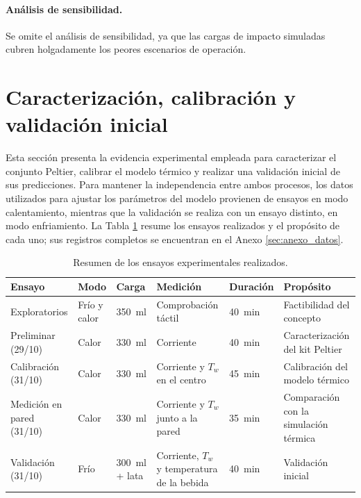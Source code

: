\documentclass[12pt, a4paper]{article}
\begin{document}
\paragraph{Análisis de sensibilidad.} Se omite el análisis de sensibilidad, ya que las cargas de impacto simuladas cubren holgadamente los peores escenarios de operación.

\section{Caracterización, calibración y validación inicial}
\label{sec:calibracion}

Esta sección presenta la evidencia experimental empleada para caracterizar el conjunto Peltier, calibrar el modelo térmico y realizar una validación inicial de sus predicciones. Para mantener la independencia entre ambos procesos, los datos utilizados para ajustar los parámetros del modelo provienen de ensayos en modo calentamiento, mientras que la validación se realiza con un ensayo distinto, en modo enfriamiento. La Tabla \ref{tab:resumen_ensayos} resume los ensayos realizados y el propósito de cada uno; sus registros completos se encuentran en el Anexo \ref{sec:anexo_datos}.

\begin{table}[H]
\centering
\small
\begin{tabularx}{\textwidth}{@{}>{\RaggedRight\arraybackslash}p{2.6cm} >{\Centering\arraybackslash}p{1.6cm} >{\Centering\arraybackslash}p{1.7cm} >{\RaggedRight\arraybackslash}X >{\Centering\arraybackslash}p{1.3cm} >{\RaggedRight\arraybackslash}p{2.6cm}@{}}
\toprule
\textbf{Ensayo} & \textbf{Modo} & \textbf{Carga} & \textbf{Medición} & \textbf{Duración} & \textbf{Propósito} \\
\midrule
Exploratorios & Frío y calor & \SI{350}{\ml} & Comprobación táctil & \SI{40}{\minute} & Factibilidad del concepto \\
Preliminar (29/10) & Calor & \SI{330}{\ml} & Corriente & \SI{40}{\minute} & Caracterización del kit Peltier \\
Calibración (31/10) & Calor & \SI{330}{\ml} & Corriente y $T_w$ en el centro & \SI{45}{\minute} & Calibración del modelo térmico \\
Medición en pared (31/10) & Calor & \SI{330}{\ml} & Corriente y $T_w$ junto a la pared & \SI{35}{\minute} & Comparación con la simulación térmica \\
Validación (31/10) & Frío & \SI{300}{\ml} + lata & Corriente, $T_w$ y temperatura de la bebida & \SI{40}{\minute} & Validación inicial \\
\bottomrule
\end{tabularx}
\caption{Resumen de los ensayos experimentales realizados.}
\label{tab:resumen_ensayos}
\end{table}
\end{document}

